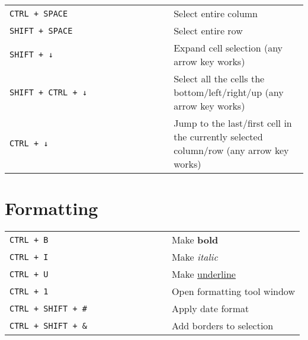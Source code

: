 \documentclass[8pt]{extarticle} %
\begin{document}
\begin{multicols}{2}
  \begin{tabular}{L{0.55\linewidth} L{0.45\linewidth}}

    \tt CTRL + SPACE            & Select entire column \\
    \tt SHIFT + SPACE           & Select entire row \\
    \tt SHIFT + ↓               & Expand cell selection (any arrow key works) \\
    \tt SHIFT + CTRL + ↓        & Select all the cells the bottom/left/right/up (any arrow key works) \\
    \tt CTRL + ↓                & Jump to the last/first cell in the currently selected column/row (any arrow key works) \\

  \end{tabular}


\section{Formatting}

  \begin{tabular}{L{0.55\linewidth} L{0.45\linewidth}}
    
    \tt CTRL + B                & Make \textbf{bold} \\
    \tt CTRL + I                & Make \textit{italic} \\
    \tt CTRL + U                & Make \underline{underline} \\
    \tt CTRL + 1                & Open formatting tool window \\
    \tt CTRL + SHIFT + \#        & Apply date format \\
    \tt CTRL + SHIFT + \&       & Add borders to selection \\
    
  \end{tabular}


\end{multicols}
\end{document}
